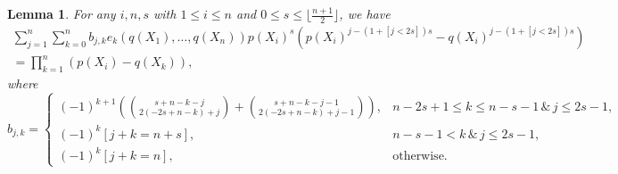 \documentclass[10pt,a4paper]{amsart}
\newtheorem{lemma}{Lemma}
\begin{document}
\begin{lemma}
\label{generalcoeff}
For any $i,n,s$ with $1 \le i \le n$ and  
$0 \le s \le \lfloor \frac{n+1}{2} \rfloor$, we have 
\begin{multline*} 
\sum_{j=1}^n \sum_{k=0}^n b_{j,k} e_k(q(X_1),\ldots,q(X_n)) p(X_i)^s \left( p(X_i)^{j-(1+[j<2s])s}-q(X_i)^{j-(1+[j<2s])s} \right) \\
=\prod_{k=1}^n (p(X_i) - q(X_k)),
\end{multline*}                   
where 
$$
b_{j,k} = 
\begin{cases} 
(-1)^{k+1} \left( \binom{s+n-k-j}{2 (-2s+n-k)+j} 
+ \binom{s+n-k-j-1}{2 (-2s+n-k)+j-1} \right),
& n-2s+1 \le k \le n -s-1 \,  \&   \, j \le 2s-1, \\
(-1)^{k} [j+k=n+s], &  n - s-1 < k \, \&   \, j \le 2s-1, \\
(-1)^k [j+k=n], & \text{otherwise}. 
\end{cases} 
$$

\end{lemma} 
\end{document}
